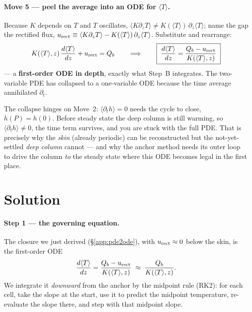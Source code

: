 \documentclass[11pt]{report}
\newcommand{\Tm}{\langle T\rangle}
\begin{document}
\paragraph{Move 5 --- peel the average into an ODE for $\Tm$.} Because $K$ depends on
$T$ and $T$ oscillates, $\langle K\partial_z T\rangle\neq K(\Tm)\,\partial_z\Tm$; name
the gap the rectified flux,
$u_{\rm rect}\equiv\langle K\partial_z T\rangle-K(\Tm)\,\partial_z\Tm$. Substitute and
rearrange:
\[
K(\Tm,z)\,\frac{d\Tm}{dz}+u_{\rm rect}=Q_b
\qquad\Longrightarrow\qquad
\boxed{\;\frac{d\Tm}{dz}=\frac{Q_b-u_{\rm rect}}{K(\Tm,z)}\;}
\]
--- a \textbf{first-order ODE in depth}, exactly what Step~B integrates. The
two-variable PDE has collapsed to a one-variable ODE because the time average
annihilated $\partial_t$.

\begin{keypt}[title={Why it is an ODE only in steady state}]
The collapse hinges on Move~2: $\langle\partial_t h\rangle=0$ needs the cycle to close,
$h(P)=h(0)$. Before steady state the deep column is still warming, so
$\langle\partial_t h\rangle\neq0$, the time term survives, and you are stuck with the
full PDE. That is precisely why the \emph{skin} (already periodic) can be reconstructed
but the not-yet-settled \emph{deep column} cannot --- and why the anchor method needs
its outer loop to drive the column \emph{to} the steady state where this ODE becomes
legal in the first place.
\end{keypt}

\section{Solution}

\paragraph{Step 1 --- the governing equation.}
The closure we just derived (\S\ref{app:pde2ode}), with $u_{\rm rect}\approx0$ below
the skin, is the first-order ODE
\[
\frac{d\Tm}{dz}=\frac{Q_b-u_{\rm rect}}{K(\Tm,z)}\;\approx\;\frac{Q_b}{K(\Tm,z)} .
\]
We integrate it \emph{downward} from the anchor by the midpoint rule (RK2): for each
cell, take the slope at the start, use it to predict the midpoint temperature,
re-evaluate the slope there, and step with that midpoint slope.
\end{document}
